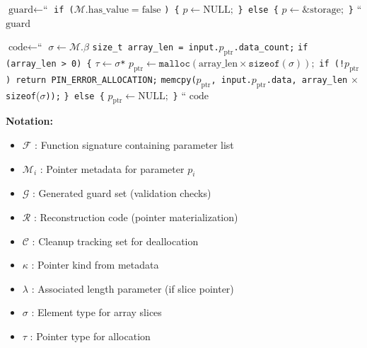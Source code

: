 \begin{algorithm}[H]
\begin{algorithmic}[1]
\vspace{0.3cm}

    \STATE $\text{guard} \leftarrow \text{``}$
    \STATE \quad \texttt{if (}$\mathcal{M}.\text{has\_value} = \text{false}$ \texttt{) \{}
    \STATE \quad \quad $p \leftarrow \text{NULL};$
    \STATE \quad \texttt{\} else \{}
    \STATE \quad \quad $p \leftarrow \&\text{storage};$
    \STATE \quad \texttt{\}}
    \STATE $\text{``}$
    \RETURN $\text{guard}$
\ENDPROCEDURE

\vspace{0.3cm}

    \STATE $\text{code} \leftarrow \text{``}$
    \STATE \quad $\sigma \leftarrow \mathcal{M}.\beta$ 
    \STATE \quad \texttt{size\_t array\_len = input.}$p_{\text{ptr}}$\texttt{.data\_count;}
    \STATE \quad \texttt{if (array\_len > 0) \{}
    \STATE \quad \quad $\tau \leftarrow \sigma$\texttt{*} 
    \STATE \quad \quad $p_{\text{ptr}} \leftarrow \texttt{malloc}(\text{array\_len} \times \texttt{sizeof}(\sigma));$
    \STATE \quad \quad \texttt{if (!}$p_{\text{ptr}}$\texttt{) return PIN\_ERROR\_ALLOCATION;}
    \STATE \quad \quad \texttt{memcpy(}$p_{\text{ptr}}$\texttt{, input.}$p_{\text{ptr}}$\texttt{.data, array\_len} $\times$ \texttt{sizeof}($\sigma$\texttt{));}
    \STATE \quad \texttt{\} else \{}
    \STATE \quad \quad $p_{\text{ptr}} \leftarrow \text{NULL};$
    \STATE \quad \texttt{\}}
    \STATE $\text{``}$
    \RETURN $\text{code}$
\ENDPROCEDURE

\end{algorithmic}
\end{algorithm}

\vspace{0.5cm}

\textbf{Notation:}
\begin{itemize}
    \item $\mathcal{F}$ : Function signature containing parameter list
    \item $\mathcal{M}_i$ : Pointer metadata for parameter $p_i$
    \item $\mathcal{G}$ : Generated guard set (validation checks)
    \item $\mathcal{R}$ : Reconstruction code (pointer materialization)
    \item $\mathcal{C}$ : Cleanup tracking set for deallocation
    \item $\kappa$ : Pointer kind from metadata
    \item $\lambda$ : Associated length parameter (if slice pointer)
    \item $\sigma$ : Element type for array slices
    \item $\tau$ : Pointer type for allocation
\end{itemize}

